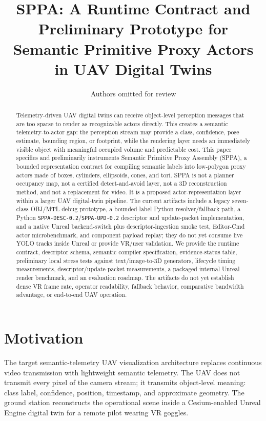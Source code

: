 ﻿\documentclass[11pt,a4paper]{article}
\title{SPPA: A Runtime Contract and Preliminary Prototype for Semantic Primitive Proxy Actors in UAV Digital Twins}
\author{Authors omitted for review}
\date{}
\begin{document}
\maketitle

\begin{abstract}
Telemetry-driven UAV digital twins can receive object-level perception messages
that are too sparse to render as recognizable actors directly. This creates a
semantic telemetry-to-actor gap: the perception stream may provide a class,
confidence, pose estimate, bounding region, or footprint, while the rendering
layer needs an immediately visible object with meaningful occupied volume and
predictable cost. This paper specifies and preliminarily instruments Semantic
Primitive Proxy Assembly (SPPA), a bounded representation contract for compiling
semantic labels into low-polygon proxy actors made of boxes, cylinders,
ellipsoids, cones, and tori. SPPA is not a planner occupancy map, not a
certified detect-and-avoid layer, not a 3D reconstruction method, and not a
replacement for video. It is a proposed actor-representation layer within a
larger UAV digital-twin pipeline. The current artifacts include a legacy
seven-class OBJ/MTL debug prototype, a bounded-label Python resolver/fallback
path, a Python \texttt{SPPA-DESC-0.2}/\texttt{SPPA-UPD-0.2} descriptor and
update-packet implementation, and a native Unreal backend-switch plus
descriptor-ingestion smoke test, Editor-Cmd actor microbenchmark, and component
payload replay; they do not yet consume live YOLO tracks inside Unreal or
provide VR/user validation. We provide the runtime contract, descriptor schema,
semantic compiler specification, evidence-status table, preliminary local
stress tests against text/image-to-3D generators, lifecycle timing measurements,
descriptor/update-packet measurements, a packaged internal Unreal render
benchmark,
and an evaluation roadmap. The artifacts do not yet establish dense VR frame
rate, operator readability, fallback behavior, comparative bandwidth advantage,
or end-to-end UAV operation.
\end{abstract}

\section{Motivation}

The target semantic-telemetry UAV visualization architecture replaces continuous video transmission with lightweight semantic
telemetry. The UAV does not transmit every pixel of the camera stream; it
transmits object-level meaning: class label, confidence, position, timestamp,
and approximate geometry. The ground station reconstructs the operational scene
inside a Cesium-enabled Unreal Engine digital twin for a remote pilot wearing VR
goggles.
\end{document}
